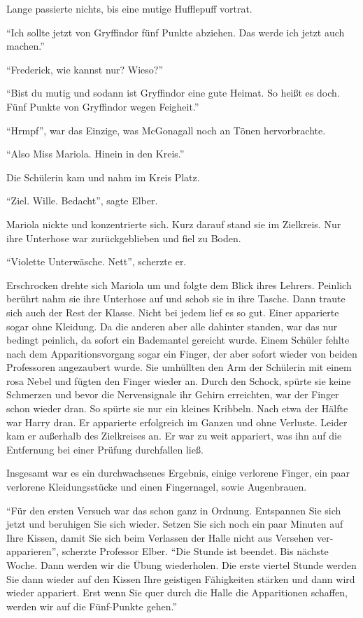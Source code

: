Lange passierte nichts, bis eine mutige Hufflepuff vortrat.

\enquote{Ich sollte jetzt von Gryffindor fünf Punkte abziehen. \gst Das werde ich jetzt auch machen.}

\enquote{Frederick, wie kannst nur\abs? Wieso?}

\enquote{Bist du mutig und so\abs dann ist Gryffindor eine gute Heimat. So heißt es doch. \gst Fünf Punkte von Gryffindor wegen Feigheit.}

\enquote{Hrmpf}, war das Einzige, was McGonagall noch an Tönen hervorbrachte.

\enquote{Also Miss Mariola. Hinein in den Kreis.}

Die Schülerin kam und nahm im Kreis Platz.

\enquote{Ziel. Wille. Bedacht}, sagte Elber.

Mariola nickte und konzentrierte sich. Kurz darauf stand sie im Zielkreis. Nur ihre Unterhose war zurückgeblieben und fiel zu Boden.

\enquote{Violette Unterwäsche. Nett}, scherzte er.

Erschrocken drehte sich Mariola um und folgte dem Blick ihres Lehrers. Peinlich berührt nahm sie ihre Unterhose auf und schob sie in ihre Tasche. Dann traute sich auch der Rest der Klasse. Nicht bei jedem lief es so gut. Einer apparierte sogar ohne Kleidung. Da die anderen aber alle dahinter standen, war das nur bedingt peinlich, da sofort ein Bademantel gereicht wurde. Einem Schüler fehlte nach dem Apparitionsvorgang sogar ein Finger, der aber sofort wieder von beiden Professoren angezaubert wurde. Sie umhüllten den Arm der Schülerin mit einem rosa Nebel und fügten den Finger wieder an. Durch den Schock, spürte sie keine Schmerzen und bevor die Nervensignale ihr Gehirn erreichten, war der Finger schon wieder dran. So spürte sie nur ein kleines Kribbeln. Nach etwa der Hälfte war Harry dran. Er apparierte erfolgreich im Ganzen und ohne Verluste. Leider kam er außerhalb des Zielkreises an. Er war zu weit appariert, was ihn auf die Entfernung bei einer Prüfung durchfallen ließ.

Insgesamt war es ein durchwachsenes Ergebnis, einige verlorene Finger, ein paar verlorene Kleidungsstücke und einen Fingernagel, sowie Augenbrauen.

\enquote{Für den ersten Versuch war das schon ganz in Ordnung. Entspannen Sie sich jetzt und beruhigen Sie sich wieder. Setzen Sie sich noch ein paar Minuten auf Ihre Kissen, damit Sie sich beim Verlassen der Halle nicht aus Versehen ver-apparieren}, scherzte Professor Elber. \enquote{Die Stunde ist beendet. Bis nächste Woche. Dann werden wir die Übung wiederholen. Die erste viertel Stunde werden Sie dann wieder auf den Kissen Ihre geistigen Fähigkeiten stärken und dann wird wieder appariert. Erst wenn Sie quer durch die Halle die Apparitionen schaffen, werden wir auf die Fünf-Punkte gehen.}

